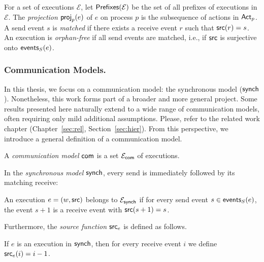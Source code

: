 For a set of executions $\mathcal{E}$, let 
$\prefixclosureof{\mathcal{E}}$ be the set of all prefixes 
of executions in $\mathcal{E}$.  
The \emph{projection} $\projofon{e}{p}$ of $e$ on process $p$  
is the subsequence of actions in $\Actp$.  
A send event $s$ is \emph{matched} if there exists a receive event $r$  
such that $\source(r) = s$.  
An execution is \emph{orphan-free} if all send events are matched,  
i.e., if $\source$ is surjective onto $\sendeventsof{e}$.  

\subsubsection*{Communication Models.}
In this thesis, we focus on a communication model: 
the synchronous model ($\synchmodel$).  
Nonetheless, this work forms part of a 
broader and more general project. Some results presented here 
naturally extend to a wide range of communication models, often requiring 
only mild additional assumptions. Please, refer to the related work chapter
(Chapter~\ref{sec:rel}, Section~\ref{sec:hier}).
From this perspective, we introduce a general definition of a communication 
model. 

\bigskip

\begin{definition}\label{def:communication-model}
A \emph{communication model} $\acommunicationmodel$  
is a set $\executionsofmodel{\acommunicationmodel}$ of executions.  
\end{definition}

In the \emph{synchronous model} $\synchmodel$,  
every send is immediately followed by its matching receive:  

\bigskip

\begin{definition}[$\synchmodel$]\label{def:synchronous}
An execution $e = (w,\source)$ belongs to 
$\executionsofmodel{\synchmodel}$ if for every send event 
$s \in \sendeventsof{e}$, the event $s+1$ is a receive event 
with $\source(s+1) = s$.  
\end{definition}
 
Furthermore, the \emph{source function} $\source_e$ is defined as follows.  

\bigskip

\begin{definition}\label{def:src}
If $e$ is an execution in $\synchmodel$, then for every receive event $i$ 
we define $\source_e(i) = i-1$.
\end{definition}


